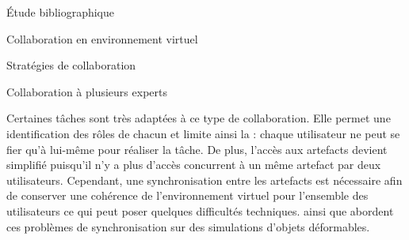 \documentclass[myfrancais,ngerman,english,frenchb]{mythesis}
\begin{document}
\begin{mychapter}{Étude bibliographique}
\begin{mysection}{Collaboration en environnement virtuel}
\begin{mysubsection}{Stratégies de collaboration}
\begin{mysubsubsection}{Collaboration à plusieurs experts}
\begin{myfigure}
\begin{myps}
							\ncput*[npos=1.5]{\myGrounding}
						\end{myps}
						\let\arraystretch\oldarraystretch
					\end{myfigure}

					Certaines tâches sont très adaptées à ce type de collaboration.
					Elle permet une identification des rôles de chacun et limite ainsi la  : chaque utilisateur ne peut se fier qu'à lui-même pour réaliser la tâche.
					De plus, l'accès aux artefacts devient simplifié puisqu'il n'y a plus d'accès concurrent à un même artefact par deux utilisateurs.
					Cependant, une synchronisation entre les artefacts est nécessaire afin de conserver une cohérence de l'environnement virtuel pour l'ensemble des utilisateurs ce qui peut poser quelques difficultés techniques.
					 ainsi que  abordent ces problèmes de synchronisation sur des simulations d'objets déformables.


\end{mysubsubsection}
\end{mysubsection}
\end{mysection}
\end{mychapter}
\end{document}
